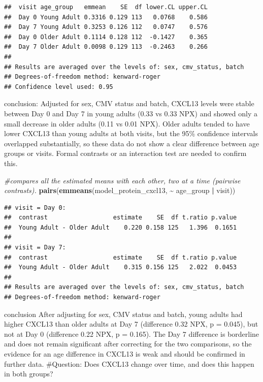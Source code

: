 \documentclass[
]{article}
\newenvironment{Shaded}{\begin{snugshade}}{\end{snugshade}}
\newcommand{\CommentTok}[1]{\textcolor[rgb]{0.56,0.35,0.01}{\textit{#1}}}
\newcommand{\FunctionTok}[1]{\textcolor[rgb]{0.13,0.29,0.53}{\textbf{#1}}}
\newcommand{\NormalTok}[1]{#1}
\newcommand{\SpecialCharTok}[1]{\textcolor[rgb]{0.81,0.36,0.00}{\textbf{#1}}}
\begin{document}
\begin{verbatim}
##  visit age_group   emmean    SE  df lower.CL upper.CL
##  Day 0 Young Adult 0.3316 0.129 113   0.0768    0.586
##  Day 7 Young Adult 0.3253 0.126 112   0.0747    0.576
##  Day 0 Older Adult 0.1114 0.128 112  -0.1427    0.365
##  Day 7 Older Adult 0.0098 0.129 113  -0.2463    0.266
## 
## Results are averaged over the levels of: sex, cmv_status, batch 
## Degrees-of-freedom method: kenward-roger 
## Confidence level used: 0.95
\end{verbatim}

conclusion: Adjusted for sex, CMV status and batch, CXCL13 levels were
stable between Day 0 and Day 7 in young adults (0.33 vs 0.33 NPX) and
showed only a small decrease in older adults (0.11 vs 0.01 NPX). Older
adults tended to have lower CXCL13 than young adults at both visits, but
the 95\% confidence intervals overlapped substantially, so these data do
not show a clear difference between age groups or visits. Formal
contrasts or an interaction test are needed to confirm this.

\begin{Shaded}
\begin{Highlighting}[]
\CommentTok{\#compares all the estimated means with each other, two at a time (pairwise contrasts).}
\FunctionTok{pairs}\NormalTok{(}\FunctionTok{emmeans}\NormalTok{(model\_protein\_cxcl13,}
\SpecialCharTok{\textasciitilde{}}\NormalTok{ age\_group }\SpecialCharTok{|}\NormalTok{ visit))}
\end{Highlighting}
\end{Shaded}

\begin{verbatim}
## visit = Day 0:
##  contrast                  estimate    SE  df t.ratio p.value
##  Young Adult - Older Adult    0.220 0.158 125   1.396  0.1651
## 
## visit = Day 7:
##  contrast                  estimate    SE  df t.ratio p.value
##  Young Adult - Older Adult    0.315 0.156 125   2.022  0.0453
## 
## Results are averaged over the levels of: sex, cmv_status, batch 
## Degrees-of-freedom method: kenward-roger
\end{verbatim}

conclusion After adjusting for sex, CMV status and batch, young adults
had higher CXCL13 than older adults at Day 7 (difference 0.32 NPX, p =
0.045), but not at Day 0 (difference 0.22 NPX, p = 0.165). The Day 7
difference is borderline and does not remain significant after
correcting for the two comparisons, so the evidence for an age
difference in CXCL13 is weak and should be confirmed in further data.
\#Question: Does CXCL13 change over time, and does this happen in both
groups?
\end{document}
